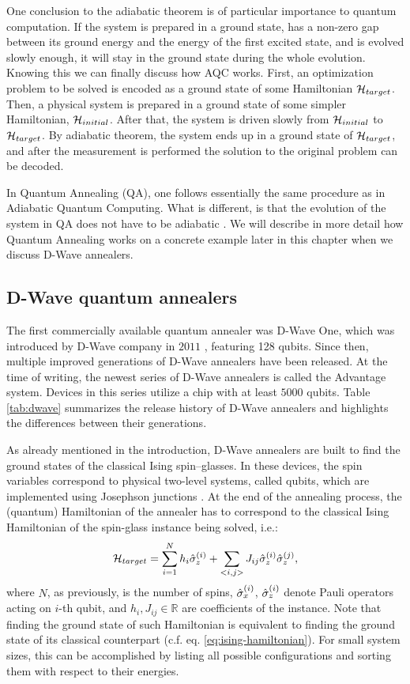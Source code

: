 One conclusion to the adiabatic theorem is of particular importance to quantum
computation. If the system is prepared in a ground state, has a non-zero gap
between its ground energy and the energy of the first excited state, and is
evolved slowly enough, it will stay in the ground state during the whole
evolution. Knowing this we can finally discuss how AQC works. First, an
optimization problem to be solved is encoded as a ground state of some
Hamiltonian $\mathcal{H}_{target}$. Then, a physical system is prepared in a ground
state of some simpler Hamiltonian, $\mathcal{H}_{initial}$. After that, the system is
driven slowly from $\mathcal{H}_{initial}$ to $\mathcal{H}_{target}$. By adiabatic theorem, the
system ends up in a ground state of $\mathcal{H}_{target}$, and after the measurement
is performed the solution to the original problem can be decoded.

In Quantum Annealing (QA), one follows essentially the same procedure as in
Adiabatic Quantum Computing. What is different, is that the evolution of the
system in QA does not have to be adiabatic \cite{Vinci2017}. We will describe
in more detail how Quantum Annealing works on a concrete example later in this
chapter when we discuss D-Wave annealers.

\subsection{D-Wave quantum annealers}

The first commercially available quantum annealer was D-Wave One, which was
introduced by D-Wave company in $2011$ \cite{johnson}, featuring 128 qubits.
Since then, multiple improved generations of D-Wave annealers have been
released. At the time of writing, the newest series of D-Wave annealers is
called the Advantage system. Devices in this series utilize a chip with at
least $5000$ qubits. Table \ref{tab:dwave} summarizes the release history of
D-Wave annealers and highlights the differences between their generations.

As already mentioned in the introduction, D-Wave annealers are built to find
the ground states of the classical Ising spin--glasses. In these devices, the
spin variables correspond to physical two-level systems, called qubits, which
are implemented using Josephson junctions \cite{chad,bauch2006quantum}. At the end of the
annealing process, the (quantum) Hamiltonian of the annealer has to correspond
to the classical Ising Hamiltonian of the spin-glass instance being solved,
i.e.:
\begin{equation}
  \mathcal{H}_{target} = \sum_{i=1}^N h_i \hat{\sigma}^{(i)}_z + \sum_{<i, j>} J_{ij} \hat{\sigma}^{(i)}_z \hat{\sigma}^{(j)}_z,
\end{equation}
where $N$, as previously, is the number of spins, $\hat{\sigma}^{(i)}_x$,
$\hat{\sigma}^{(i)}_z$ denote Pauli operators acting on $i$-th qubit, and $h_i,
  J_{ij} \in \mathbb{R}$ are coefficients of the instance. Note that finding the
ground state of such Hamiltonian is equivalent to finding the ground state of
its classical counterpart (c.f. eq. \eqref{eq:ising-hamiltonian}). For small
system sizes, this can be accomplished by listing all possible configurations
and sorting them with respect to their energies.

